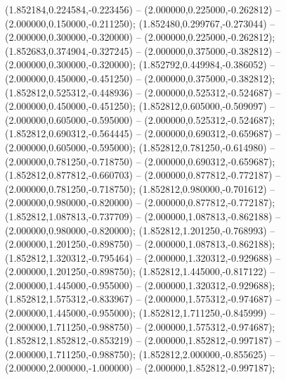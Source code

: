  (1.852184,0.224584,-0.223456) -- (2.000000,0.225000,-0.262812) -- (2.000000,0.150000,-0.211250);
 (1.852480,0.299767,-0.273044) -- (2.000000,0.300000,-0.320000) -- (2.000000,0.225000,-0.262812);
 (1.852683,0.374904,-0.327245) -- (2.000000,0.375000,-0.382812) -- (2.000000,0.300000,-0.320000);
 (1.852792,0.449984,-0.386052) -- (2.000000,0.450000,-0.451250) -- (2.000000,0.375000,-0.382812);
 (1.852812,0.525312,-0.448936) -- (2.000000,0.525312,-0.524687) -- (2.000000,0.450000,-0.451250);
 (1.852812,0.605000,-0.509097) -- (2.000000,0.605000,-0.595000) -- (2.000000,0.525312,-0.524687);
 (1.852812,0.690312,-0.564445) -- (2.000000,0.690312,-0.659687) -- (2.000000,0.605000,-0.595000);
 (1.852812,0.781250,-0.614980) -- (2.000000,0.781250,-0.718750) -- (2.000000,0.690312,-0.659687);
 (1.852812,0.877812,-0.660703) -- (2.000000,0.877812,-0.772187) -- (2.000000,0.781250,-0.718750);
 (1.852812,0.980000,-0.701612) -- (2.000000,0.980000,-0.820000) -- (2.000000,0.877812,-0.772187);
 (1.852812,1.087813,-0.737709) -- (2.000000,1.087813,-0.862188) -- (2.000000,0.980000,-0.820000);
 (1.852812,1.201250,-0.768993) -- (2.000000,1.201250,-0.898750) -- (2.000000,1.087813,-0.862188);
 (1.852812,1.320312,-0.795464) -- (2.000000,1.320312,-0.929688) -- (2.000000,1.201250,-0.898750);
 (1.852812,1.445000,-0.817122) -- (2.000000,1.445000,-0.955000) -- (2.000000,1.320312,-0.929688);
 (1.852812,1.575312,-0.833967) -- (2.000000,1.575312,-0.974687) -- (2.000000,1.445000,-0.955000);
 (1.852812,1.711250,-0.845999) -- (2.000000,1.711250,-0.988750) -- (2.000000,1.575312,-0.974687);
 (1.852812,1.852812,-0.853219) -- (2.000000,1.852812,-0.997187) -- (2.000000,1.711250,-0.988750);
 (1.852812,2.000000,-0.855625) -- (2.000000,2.000000,-1.000000) -- (2.000000,1.852812,-0.997187);
